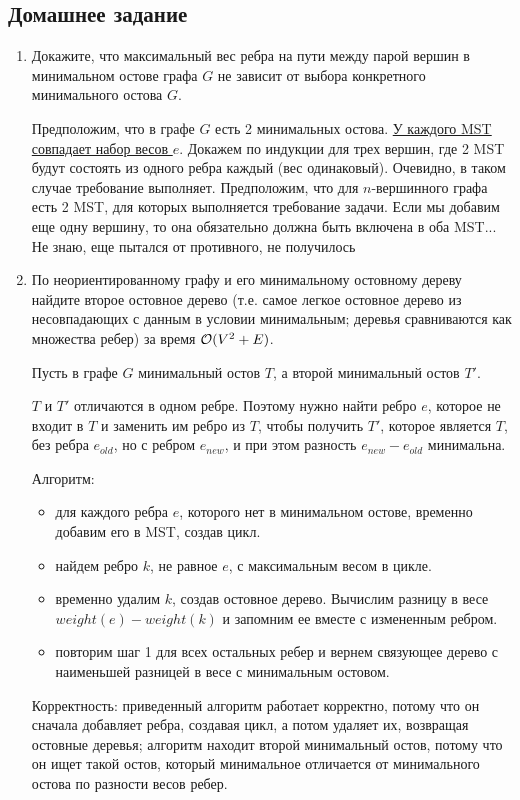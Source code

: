 \subsection{Домашнее задание}
\begin{enumerate}
  \item
    Докажите, что максимальный вес ребра на пути между парой вершин в минимальном остове графа $G$
    не зависит от выбора конкретного минимального остова $G$.
    \begin{solution}
      Предположим, что в графе $G$ есть 2 минимальных остова. \href{https://stackoverflow.com/questions/23251206/can-two-minimum-spanning-trees-for-the-same-graph-have-different-edge-weights}{У каждого MST совпадает набор весов $e$}. Докажем по индукции для трех вершин, где 2 MST будут состоять из одного ребра каждый (вес одинаковый). Очевидно, в таком случае требование выполняет. Предположим, что для $n$-вершинного графа есть 2 MST, для которых выполняется требование задачи. Если мы добавим еще одну вершину, то она обязательно должна быть включена в оба MST... Не знаю, еще пытался от противного, не получилось
    \end{solution}
    
  \item 
    По неориентированному графу и его минимальному остовному дереву найдите второе остовное
    дерево (т.е. самое легкое остовное дерево из несовпадающих с данным в условии минимальным;
    деревья сравниваются как множества ребер) за время $\mathcal{O}(V^2 + E)$.

    \begin{solution}
      Пусть в графе $G$ минимальный остов $T$, а второй минимальный остов $T'$.
      
      $T$ и $T'$ отличаются в одном ребре. Поэтому нужно найти ребро $e$, которое не входит в $T$ и заменить им ребро из $T$, чтобы получить $T'$, которое является $T$, без ребра $e_{old}$, но с ребром $e_{new}$, и при этом разность $e_{new}-e_{old}$ минимальна.
      
      Алгоритм:
      \begin{itemize}
        \item для каждого ребра $e$, которого нет в минимальном остове, временно добавим его в MST, создав цикл.
        \item найдем ребро $k$, не равное $e$, с максимальным весом в цикле.
        \item временно удалим $k$, создав остовное дерево. Вычислим разницу в весе $weight(e)-weight(k)$ и запомним ее вместе с измененным ребром.
        \item повторим шаг 1 для всех остальных ребер и вернем связующее дерево с наименьшей разницей в весе с минимальным остовом.
      \end{itemize}
      Корректность:
      приведенный алгоритм работает корректно, потому что он сначала добавляет ребра, создавая цикл, а потом удаляет их, возвращая остовные деревья; алгоритм находит второй минимальный остов, потому что он ищет такой остов, который минимальное отличается от минимального остова по разности весов ребер.


\end{solution}
\end{enumerate}
